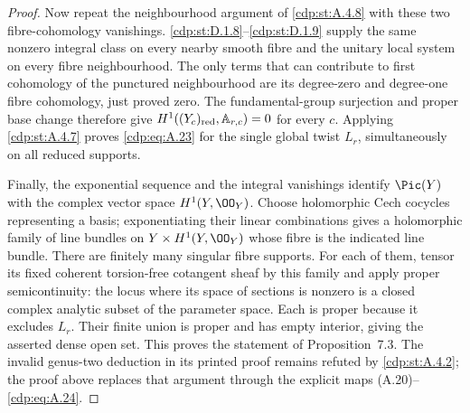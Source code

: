 \begin{proof}
Now repeat the neighbourhood argument of \ref{cdp:st:A.4.8} with these two fibre-cohomology vanishings. \ref{cdp:st:D.1.8}--\ref{cdp:st:D.1.9} supply the same nonzero integral class on every nearby smooth fibre and the unitary local system on every fibre neighbourhood. The only terms that can contribute to first cohomology of the punctured neighbourhood are its degree-zero and degree-one fibre cohomology, just proved zero. The fundamental-group surjection and proper base change therefore give $H^1((Y_c)_{\rm red},\mathbb A_{r,c})=0$ for every $c$. Applying \ref{cdp:st:A.4.7} proves \eqref{cdp:eq:A.23} for the single global twist $L_r$, simultaneously on all reduced supports.

Finally, the exponential sequence and the integral vanishings identify $\Pic(Y)$ with the complex vector space $H^1(Y,\OO_Y)$. Choose holomorphic Cech cocycles representing a basis; exponentiating their linear combinations gives a holomorphic family of line bundles on $Y\times H^1(Y,\OO_Y)$ whose fibre is the indicated line bundle. There are finitely many singular fibre supports. For each of them, tensor its fixed coherent torsion-free cotangent sheaf by this family and apply proper semicontinuity: the locus where its space of sections is nonzero is a closed complex analytic subset of the parameter space. Each is proper because it excludes $L_r$. Their finite union is proper and has empty interior, giving the asserted dense open set. This proves the statement of Proposition~7.3. The invalid genus-two deduction in its printed proof remains refuted by \ref{cdp:st:A.4.2}; the proof above replaces that argument through the explicit maps (A.20)--\eqref{cdp:eq:A.24}.
\end{proof}